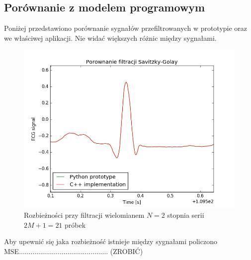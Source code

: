 \subsection{Porównanie z modelem programowym}

Poniżej przedstawiono porównanie sygnałów przefiltrowanych w prototypie oraz we właściwej aplikacji. Nie widać większych różnic między sygnałami.


\begin{figure}[H]
  \begin{center}
    \includegraphics[scale=0.8]
    {img/implem_vs_proto.png}
  \end{center}
  \caption{Rozbieżności przy filtracji wielomianem $N=2$ stopnia serii $2M+1=21$ próbek}
  \label{rys:implem}
\end{figure}


Aby upewnić się jaka rozbieżność istnieje między sygnałami policzono MSE.............................................. (ZROBIĆ)